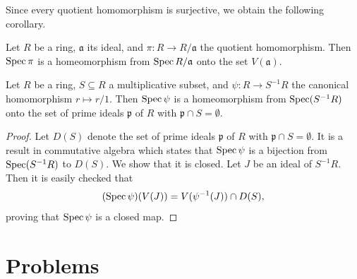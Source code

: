 Since every quotient homomorphism is surjective, we obtain the following corollary.

\begin{corollary}\label{chap2:quotient-isomorphic-to-V}
	Let $R$ be a ring, $\mathfrak{a}$ its ideal, and $\pi \colon R \to R/\mathfrak{a}$ the quotient homomorphism. Then $\operatorname{Spec} \pi$ is a homeomorphism from $\operatorname{Spec} R/\mathfrak{a}$ onto the set $V(\mathfrak{a})$.
\end{corollary}

\begin{proposition}\label{chap2:localisations-isomorphic-to-spec}
	Let $R$ be a ring, $S \subseteq R$ a multiplicative subset, and $\psi \colon R \to S^{-1}R$ the canonical homomorphism $r \mapsto r/1$. Then $\operatorname{Spec} \psi$ is a homeomorphism from $\operatorname{Spec}(S^{-1}R)$ onto the set of prime ideals $\mathfrak{p}$ of $R$ with $\mathfrak{p} \cap S = \emptyset$.
\end{proposition}

\begin{proof}
	Let $D(S)$ denote the set of prime ideals $\mathfrak{p}$ of $R$ with $\mathfrak{p} \cap S = \emptyset$. It is a result in commutative algebra which states that $\operatorname{Spec} \psi$ is a bijection from $\operatorname{Spec}(S^{-1}R)$ to $D(S)$. We show that it is closed. Let $J$ be an ideal of $S^{-1}R$. Then it is easily checked that
	\begin{equation*}
		(\operatorname{Spec} \psi)(V(J)) = V(\psi^{-1}(J)) \cap D(S),
	\end{equation*}
	proving that $\operatorname{Spec} \psi$ is a closed map.
\end{proof}

\section{Problems}

